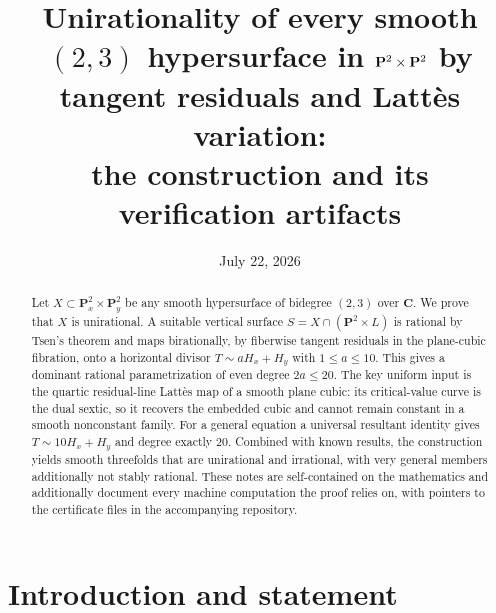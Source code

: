 \documentclass[11pt]{amsart}
\title[Unirationality of smooth $(2,3)$ hypersurfaces in $\PP^2\times\PP^2$]
{Unirationality of every smooth $(2,3)$ hypersurface in
$\PP^2\times\PP^2$ by tangent residuals and Latt\`es variation:\\
the construction and its verification artifacts}
\date{July 22, 2026}
\theoremstyle{definition}
\theoremstyle{remark}
\newcommand{\PP}{\mathbf{P}}
\newcommand{\CC}{\mathbf{C}}
\newcommand{\Hx}{H_x}
\newcommand{\Hy}{H_y}
\begin{document}
\begin{abstract}
Let $X\subset\PP^2_x\times\PP^2_y$ be any smooth hypersurface of bidegree
$(2,3)$ over $\CC$.  We prove that $X$ is unirational.  A suitable vertical
surface $S=X\cap(\PP^2\times L)$ is rational by Tsen's theorem and maps
birationally, by fiberwise tangent residuals in the plane-cubic fibration,
onto a horizontal divisor $T\sim a\Hx+\Hy$ with $1\leq a\leq10$.  This
gives a dominant rational parametrization of even degree $2a\leq20$.
The key uniform input is the quartic residual-line Latt\`es map of a smooth
plane cubic: its critical-value curve is the dual sextic, so it recovers the
embedded cubic and cannot remain constant in a smooth nonconstant family.
For a general equation a universal resultant identity gives
$T\sim10\Hx+\Hy$ and degree exactly $20$.  Combined with known results, the
construction yields smooth threefolds that are unirational and irrational,
with very general members additionally not stably rational.  These notes are
self-contained on the mathematics and additionally document every machine
computation the proof relies on, with pointers to the certificate files in
the accompanying repository.
\end{abstract}

\maketitle
\tableofcontents

\section{Introduction and statement}\label{sec:intro}
\end{document}
